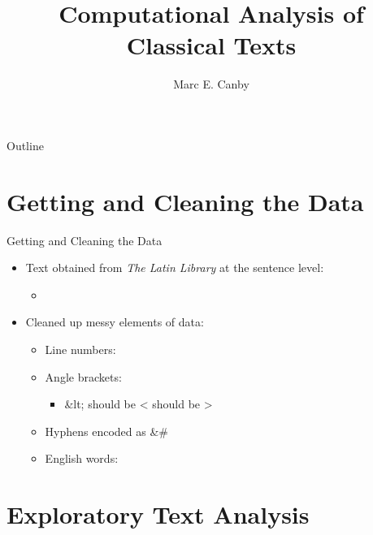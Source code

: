 \documentclass{beamer}
\title{Computational Analysis of Classical Texts}
\author{Marc E. Canby}
\institute[] %
{
	\inst{}%
	Lati 318 $-$ Cicero: \textit{De Re Publica}\\
	Rice University

}
\date{}
\begin{document}
\begin{frame}
\titlepage
\end{frame}

\begin{frame}{Outline}
\tableofcontents
\end{frame}

\section{Getting and Cleaning the Data}

\begin{frame}{Getting and Cleaning the Data}


\begin{itemize}
	\setlength\itemsep{1em}
	\item Text obtained from \textit{The Latin Library} at the sentence level:
	\begin{itemize}
		\item {}
	\end{itemize}
\item Cleaned up messy elements of data:
\begin{itemize}
	\setlength\itemsep{0.5em}
	\item Line numbers: {\ttfamily [1,2,...,71]}
	\item Angle brackets: {}
	\begin{itemize}
		\item {\ttfamily \&lt;} should be {\ttfamily <}  should be {\ttfamily >}
	\end{itemize}
\item Hyphens encoded as {\ttfamily \&\#}
\item English words: {}
\end{itemize}
\end{itemize}

\end{frame}




\section{Exploratory Text Analysis}
\end{document}
